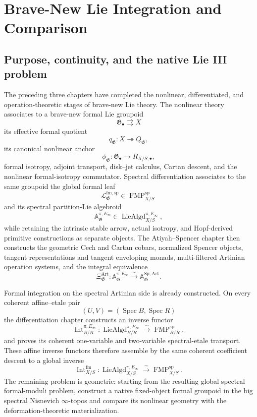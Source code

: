 \chapter{Brave-New Lie Integration and Comparison}
\label{ch:brave-new-lie-integration}

\section{Purpose, continuity, and the native Lie III problem}
\label{sec:bnli-purpose}

The preceding three chapters have completed the nonlinear, differentiated, and
operation-theoretic stages of brave-new Lie theory.  The nonlinear theory
associates to a brave-new formal Lie groupoid
\[
    \mathfrak G_\bullet\rightrightarrows X
\]
its effective formal quotient
\[
    q_{\mathfrak G}:X\twoheadrightarrow Q_{\mathfrak G},
\]
its canonical nonlinear anchor
\[
    \phi_{\mathfrak G}:\mathfrak G_\bullet\longrightarrow R_{X/S,\bullet},
\]
formal isotropy, adjoint transport, disk--jet calculus, Cartan descent, and the
nonlinear formal-isotropy commutator.  Spectral differentiation associates to
the same groupoid the global formal leaf
\[
    \mathcal L^{\mathrm{fm,sp}}_{\mathfrak G}
    \in \operatorname{FMP}^{\mathrm{sp}}_{X/S}
\]
and its spectral partition-Lie algebroid
\[
    \mathbb A^{\pi,E_\infty}_{\mathfrak G}
    \in \operatorname{LieAlgd}^{\pi,E_\infty}_{X/S},
\]
while retaining the intrinsic stable arrow, actual isotropy, and Hopf-derived
primitive constructions as separate objects.  The Atiyah--Spencer chapter then
constructs the geometric Cech and Cartan cobars, normalized Spencer objects,
tangent representations and tangent enveloping monads, multi-filtered Artinian
operation systems, and the integral equivalence
\[
    \Xi^{\mathrm{Art}}_{\mathfrak G}:
    \mathbb A^{\pi,E_\infty}_{\mathfrak G}
    \xrightarrow{\sim}
    \mathbb A^{\mathrm{Sp,Art}}_{\mathfrak G}.
\]

Formal integration on the spectral Artinian side is already constructed.
On every coherent affine--etale pair
\[
    (U,V)=(\operatorname{Spec}B,\operatorname{Spec}R)
\]
the differentiation chapter constructs an inverse functor
\[
    \operatorname{Int}^{\pi,E_\infty}_{B/R}:
    \operatorname{LieAlgd}^{\pi,E_\infty}_{B/R}
    \xrightarrow{\sim}
    \operatorname{FMP}^{\mathrm{sp}}_{B/R},
\]
and proves its coherent one-variable and two-variable spectral-etale
transport.  These affine inverse functors therefore assemble by the same
coherent coefficient descent to a global inverse
\[
    \operatorname{Int}^{\mathrm{fm}}_{X/S}:
    \operatorname{LieAlgd}^{\pi,E_\infty}_{X/S}
    \xrightarrow{\sim}
    \operatorname{FMP}^{\mathrm{sp}}_{X/S}.
\]
The remaining problem is geometric: starting from the resulting global
spectral formal-moduli problem, construct a native fixed-object formal groupoid
in the big spectral Nisnevich $\infty$-topos and compare its nonlinear geometry
with the deformation-theoretic materialization.


